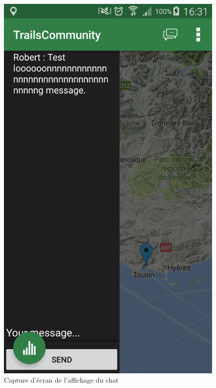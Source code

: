 \documentclass[titlepage, 12pt]{report}
\begin{document}
\begin{figure}[!h]
	\caption{Capture d'écran de l'affichage du chat}
	\label{screenshots_chat}
	\centering
	\includegraphics[scale=0.2]{Images/screenshots/chat.png}
\end{figure}

\clearpage
\end{document}

